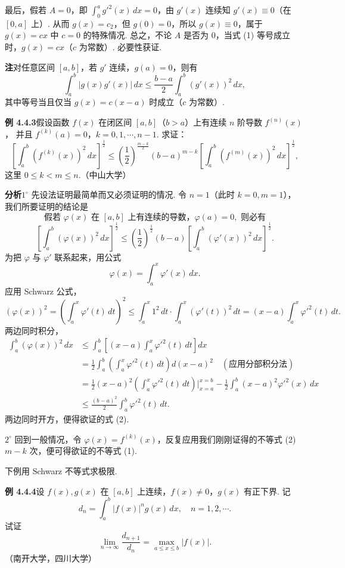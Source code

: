 \documentclass[UTF8, 12pt, fontset=fandol, oneside]{ctexart}
\begin{document}
最后，假若 $A=0$，即 $\displaystyle\int_0^a g'^2(x)\,dx=0$，由 $g'(x)$ 连续知 $g'(x)\equiv0$（在 $[0,a]$ 上）.
从而 $g(x)=c_2$，但 $g(0)=0$，所以 $g(x)\equiv0$，属于 $g(x)=cx$ 中 $c=0$ 的特殊情况.
总之，不论 $A$ 是否为 0，当式 (1) 等号成立时，$g(x)=cx$（$c$ 为常数）. 必要性获证.

\noindent\textbf{注}\quad 对任意区间 $[a,b]$，若 $g'$ 连续，$g(a)=0$，则有
\[
\int_a^b |g(x)g'(x)|\,dx\le\frac{b-a}{2}\int_a^b (g'(x))^2\,dx,
\]
其中等号当且仅当 $g(x)=c(x-a)$ 时成立（$c$ 为常数）.

\noindent\textbf{例 4.4.3}\quad 假设函数 $f(x)$ 在闭区间 $[a,b]$（$b>a$）上有连续 $n$ 阶导数 $f^{(n)}(x)$，
并且 $f^{(k)}(a)=0$，$k=0,1,\cdots,n-1$. 求证：
\[
\left[\int_a^b (f^{(k)}(x))^2\,dx\right]^{\frac12}
\le \left(\frac12\right)^{\frac{m-k}{2}}(b-a)^{m-k}
\left[\int_a^b (f^{(m)}(x))^2\,dx\right]^{\frac12}, \tag{1}
\]
这里 $0\le k<m\le n$.（中山大学）

\noindent\textbf{分析}\quad $1^\circ$ 先设法证明最简单而又必须证明的情况. 令 $n=1$（此时 $k=0,m=1$），
我们所要证明的结论是
\[
\text{假若 }\varphi(x)\text{ 在 }[a,b]\text{ 上有连续的导数，}\varphi(a)=0,\text{ 则必有}
\]
\[
\left[\int_a^b(\varphi(x))^2\,dx\right]^{\frac12}
\le \left(\frac12\right)^{\frac12}(b-a)
\left[\int_a^b(\varphi'(x))^2\,dx\right]^{\frac12}. \tag{2}
\]
为把 $\varphi$ 与 $\varphi'$ 联系起来，用公式
\[
\varphi(x)=\int_a^x\varphi'(x)\,dx.
\]
应用 Schwarz 公式，
\[
(\varphi(x))^2=\left(\int_a^x\varphi'(t)\,dt\right)^2
\le \int_a^x1^2\,dt\cdot\int_a^x(\varphi'(t))^2\,dt
=(x-a)\int_a^x\varphi'^2(t)\,dt. \tag{3}
\]
两边同时积分，
\[
\begin{aligned}
\int_a^b(\varphi(x))^2\,dx
&\le\int_a^b\left[(x-a)\int_a^x\varphi'^2(t)\,dt\right]dx\\
&=\frac12\int_a^b\left(\int_a^x\varphi'^2(t)\,dt\right)d(x-a)^2\quad(\text{应用分部积分法})\\
&=\frac12(x-a)^2\left(\int_a^x\varphi'^2(t)\,dt\right)\bigg|_{x=a}^{x=b}
-\frac12\int_a^b(x-a)^2\varphi'^2(x)\,dx\\
&\le\frac{(b-a)^2}{2}\int_a^b\varphi'^2(t)\,dt.
\end{aligned}
\]
两边同时开方，便得欲证的式 (2).

$2^\circ$ 回到一般情况，令 $\varphi(x)=f^{(k)}(x)$，反复应用我们刚刚证得的不等式 (2) $m-k$ 次，便可得欲证的不等式 (1).

下例用 Schwarz 不等式求极限.

\noindent\textbf{例 4.4.4}\quad 设 $f(x),g(x)$ 在 $[a,b]$ 上连续，$f(x)\ne0$，$g(x)$ 有正下界. 记
\[
d_n=\int_a^b |f(x)|^n g(x)\,dx,\quad n=1,2,\cdots.
\]
试证
\[
\lim_{n\to\infty}\frac{d_{n+1}}{d_n}=\max_{a\le x\le b}|f(x)|.
\]
（南开大学，四川大学）
\end{document}
